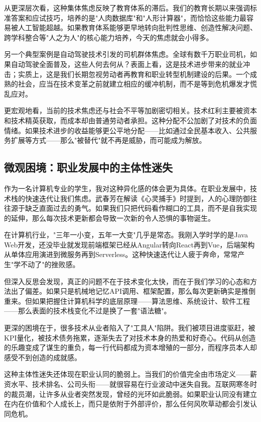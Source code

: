 \documentclass[a4paper,12pt]{ctexart}
\begin{document}
从更深层次看，这种集体焦虑反映了教育体系的滞后。我们的教育长期以来强调标准答案和应试技巧，培养的是"人肉数据库"和"人形计算器"，而恰恰这些能力最容易被人工智能超越。如果教育体系能够更早地转向批判性思维、创造性解决问题、跨学科整合等"人之为人"的核心能力培养，今天的焦虑就会小得多。

另一个典型案例是自动驾驶技术引发的司机群体焦虑。全球有数千万职业司机，如果自动驾驶全面普及，这些人何去何从？表面上看，这是技术进步带来的就业冲击；实质上，这是我们长期忽视劳动者再教育和职业转型机制建设的后果。一个成熟的社会，应当在技术变革之前就建立相应的缓冲机制，而不是等到危机爆发才慌乱应对。

更宏观地看，当前的技术焦虑还与社会不平等加剧密切相关。技术红利主要被资本和技术精英获取，而成本却由普通劳动者承担。这种分配不公加剧了对技术的负面情绪。如果技术进步的收益能够更公平地分配——比如通过全民基本收入、公共服务扩展等方式——那么"被替代"就不再是威胁，而可能成为解放。

\subsection{微观困境：职业发展中的主体性迷失}

作为一名计算机专业的学生，我对这种异化感的体会更为具体。在职业发展中，技术栈的快速迭代让我们焦虑。武春芳在解读《心灵捕手》时提到，人的心理防御往往源于缺乏直面过去的勇气。如果我们只把代码看作糊口的工具，而不是自我实现的延伸，那么每次技术更新都会导致一次新的令人恐惧的事物诞生。

在计算机行业，"三年一小变，五年一大变"几乎是常态。我刚入学时学的是Java Web开发，还没毕业就发现前端框架已经从Angular转向React再到Vue，后端架构从单体应用演进到微服务再到Serverless。这种快速迭代让人疲于奔命，常常产生"学不动了"的挫败感。

但深入反思会发现，真正的问题不在于技术变化太快，而在于我们学习的心态和方法出了偏差。如果只是机械地记忆API调用、框架配置，那么每次更新确实是推倒重来。但如果把握住计算机科学的底层原理——算法思维、系统设计、软件工程——那么表面的技术栈变化不过是换了一套"语法糖"。

更深的困境在于，很多技术从业者陷入了"工具人"陷阱。我们被项目进度驱赶，被KPI量化，被技术债务拖累，逐渐失去了对技术本身的热爱和好奇心。代码从创造的乐趣变成了谋生的重负，每一行代码都成为资本增殖的一部分，而程序员本人却感受不到创造的成就感。

这种主体性迷失还体现在职业认同的脆弱上。当我们的价值完全由市场定义——薪资水平、技术排名、公司头衔——就很容易在行业波动中迷失自我。互联网寒冬时的裁员潮，让许多从业者突然发现，曾经的光环如此脆弱。如果职业认同没有建立在内在价值和个人成长上，而只是依附于外部评价，那么任何风吹草动都会引发认同危机。
\end{document}
